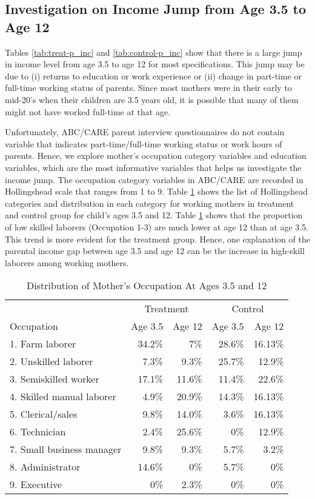 \documentclass[12pt]{article}
\begin{document}
\subsection{Investigation on Income Jump from Age 3.5 to Age 12}

Tables \ref{tab:treat-p_inc} and \ref{tab:control-p_inc} show that there is a large jump in income level from age 3.5 to age 12 for most specifications. This jump may be due to (i) returns to education or work experience or (ii) change in part-time or full-time working status of parents. Since most mothers were in their early to mid-20's when their children are 3.5 years old, it is possible that many of them might not have worked full-time at that age.  

Unfortunately, ABC/CARE parent interview questionnaires do not contain variable that indicates part-time/full-time working status or work hours of parents. Hence, we explore mother's occupation category variables and education variables, which are the most informative variables that helps us investigate the income jump. The occupation category variables in ABC/CARE are recorded in Hollingshead scale that ranges from 1 to 9. Table \ref{tab:occ-distribution} shows the list of Hollingshead categories and distribution in each category for working mothers in treatment and control group for child's ages 3.5 and 12. Table \ref{tab:occ-distribution} shows that the proportion of low skilled laborers (Occupation 1-3) are much lower at age 12 than at age 3.5. This trend is more evident for the treatment group. Hence, one explanation of the parental income gap between age 3.5 and age 12 can be the increase in high-skill laborers among working mothers.

\begin{table}[H] \caption{Distribution of Mother's Occupation At Ages 3.5 and 12} \label{tab:occ-distribution}
	\begin{tabular}{lrrrr}
	\toprule
	& \multicolumn{2}{c}{Treatment} & \multicolumn{2}{c}{Control}  \\\cmidrule(lr){2-3} \cmidrule(lr){4-5} 
 Occupation & Age 3.5 & Age 12 & Age 3.5 & Age 12 \\
\midrule
	 1. Farm laborer & 34.2\% & 7\%  &  28.6\% 	& 16.13\% 		\\
	 2. Unskilled laborer & 7.3\% & 9.3\% 	& 25.7\% & 12.9\%	 \\
	 3. Semiskilled worker & 17.1\%	& 11.6\% & 11.4\%& 22.6\%	\\
	 4. Skilled manual laborer 	 & 4.9\%	& 20.9\% & 14.3\% & 16.13\%	\\
	 5. Clerical/sales & 9.8\%		& 14.0\% & 3.6\%& 16.13\% 	\\
	 6. Technician 	& 2.4\%	& 25.6\% & 0\%	& 12.9\% 			\\
	 7. Small business manager & 9.8\%	& 9.3\%	& 5.7\%	& 3.2\% \\
	 8. Administrator & 14.6\% 	& 0\%	& 5.7\%	& 0\% 			\\
	 9. Executive 	& 0\%		& 2.3\%		& 0\% & 0\%			\\
	\bottomrule
	\end{tabular}
\end{table}
\end{document}
